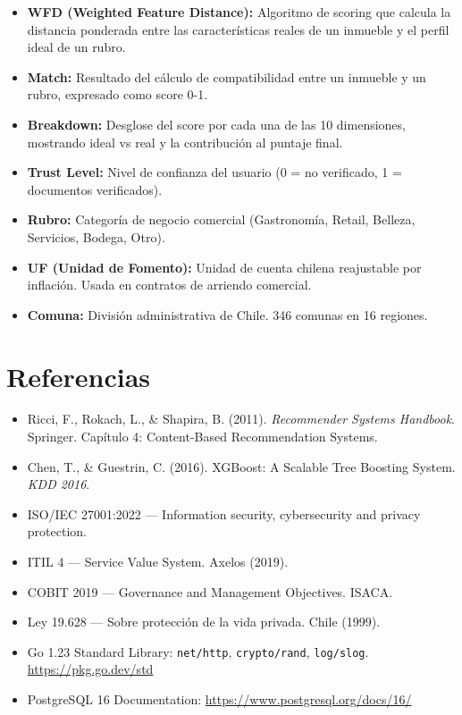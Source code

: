 \documentclass[11pt,a4paper]{article}
\begin{document}
\begin{itemize}
    \item \textbf{WFD (Weighted Feature Distance):} Algoritmo de scoring que calcula la distancia ponderada entre las características reales de un inmueble y el perfil ideal de un rubro.
    \item \textbf{Match:} Resultado del cálculo de compatibilidad entre un inmueble y un rubro, expresado como score 0-1.
    \item \textbf{Breakdown:} Desglose del score por cada una de las 10 dimensiones, mostrando ideal vs real y la contribución al puntaje final.
    \item \textbf{Trust Level:} Nivel de confianza del usuario (0 = no verificado, 1 = documentos verificados).
    \item \textbf{Rubro:} Categoría de negocio comercial (Gastronomía, Retail, Belleza, Servicios, Bodega, Otro).
    \item \textbf{UF (Unidad de Fomento):} Unidad de cuenta chilena reajustable por inflación. Usada en contratos de arriendo comercial.
    \item \textbf{Comuna:} División administrativa de Chile. 346 comunas en 16 regiones.
\end{itemize}

\section{Referencias}

\begin{itemize}
    \item Ricci, F., Rokach, L., \& Shapira, B. (2011). \textit{Recommender Systems Handbook}. Springer. Capítulo 4: Content-Based Recommendation Systems.
    \item Chen, T., \& Guestrin, C. (2016). XGBoost: A Scalable Tree Boosting System. \textit{KDD 2016}.
    \item ISO/IEC 27001:2022 — Information security, cybersecurity and privacy protection.
    \item ITIL 4 — Service Value System. Axelos (2019).
    \item COBIT 2019 — Governance and Management Objectives. ISACA.
    \item Ley 19.628 — Sobre protección de la vida privada. Chile (1999).
    \item Go 1.23 Standard Library: \texttt{net/http}, \texttt{crypto/rand}, \texttt{log/slog}. \url{https://pkg.go.dev/std}
    \item PostgreSQL 16 Documentation: \url{https://www.postgresql.org/docs/16/}
\end{itemize}
\end{document}
